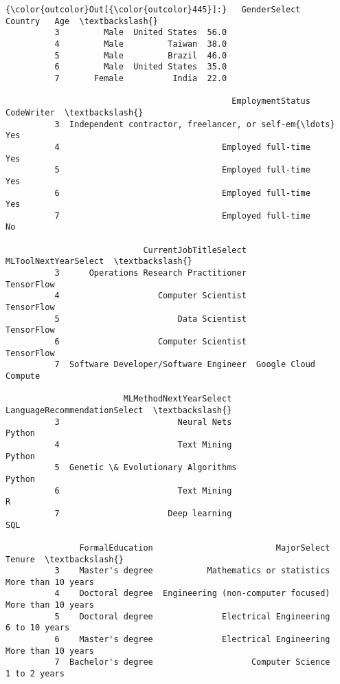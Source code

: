 \documentclass[11pt]{article}
\begin{document}
\begin{Verbatim}[commandchars=\\\{\}]
{\color{outcolor}Out[{\color{outcolor}445}]:}   GenderSelect        Country   Age  \textbackslash{}
          3         Male  United States  56.0   
          4         Male         Taiwan  38.0   
          5         Male         Brazil  46.0   
          6         Male  United States  35.0   
          7       Female          India  22.0   
          
                                              EmploymentStatus CodeWriter  \textbackslash{}
          3  Independent contractor, freelancer, or self-em{\ldots}        Yes   
          4                                 Employed full-time        Yes   
          5                                 Employed full-time        Yes   
          6                                 Employed full-time        Yes   
          7                                 Employed full-time         No   
          
                            CurrentJobTitleSelect  MLToolNextYearSelect  \textbackslash{}
          3      Operations Research Practitioner            TensorFlow   
          4                    Computer Scientist            TensorFlow   
          5                        Data Scientist            TensorFlow   
          6                    Computer Scientist            TensorFlow   
          7  Software Developer/Software Engineer  Google Cloud Compute   
          
                        MLMethodNextYearSelect LanguageRecommendationSelect  \textbackslash{}
          3                        Neural Nets                       Python   
          4                        Text Mining                       Python   
          5  Genetic \& Evolutionary Algorithms                       Python   
          6                        Text Mining                            R   
          7                      Deep learning                          SQL   
          
               FormalEducation                         MajorSelect              Tenure  \textbackslash{}
          3    Master's degree           Mathematics or statistics  More than 10 years   
          4    Doctoral degree  Engineering (non-computer focused)  More than 10 years   
          5    Doctoral degree              Electrical Engineering       6 to 10 years   
          6    Master's degree              Electrical Engineering  More than 10 years   
          7  Bachelor's degree                    Computer Science        1 to 2 years   
          

\end{Verbatim}
\end{document}
